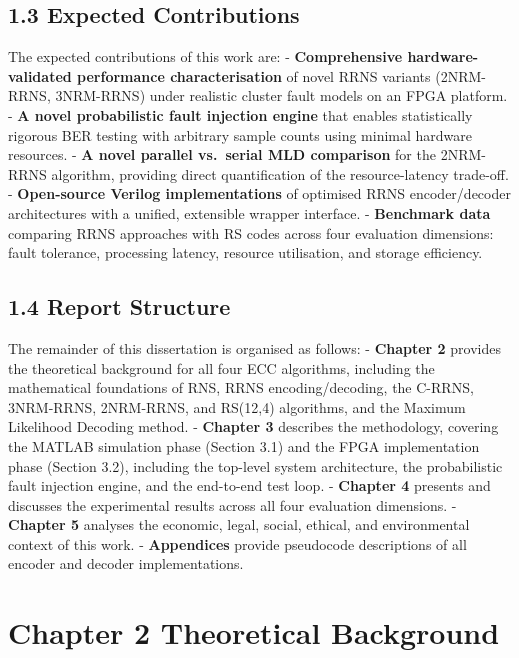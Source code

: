 \documentclass[
  12pt,
  a4paper]{report}
\begin{document}
\section{1.3 Expected Contributions}\label{expected-contributions}

The expected contributions of this work are: - \textbf{Comprehensive
hardware-validated performance characterisation} of novel RRNS variants
(2NRM-RRNS, 3NRM-RRNS) under realistic cluster fault models on an FPGA
platform. - \textbf{A novel probabilistic fault injection engine} that
enables statistically rigorous BER testing with arbitrary sample counts
using minimal hardware resources. - \textbf{A novel parallel vs.~serial
MLD comparison} for the 2NRM-RRNS algorithm, providing direct
quantification of the resource-latency trade-off. - \textbf{Open-source
Verilog implementations} of optimised RRNS encoder/decoder architectures
with a unified, extensible wrapper interface. - \textbf{Benchmark data}
comparing RRNS approaches with RS codes across four evaluation
dimensions: fault tolerance, processing latency, resource utilisation,
and storage efficiency.

\section{1.4 Report Structure}\label{report-structure}

The remainder of this dissertation is organised as follows: -
\textbf{Chapter 2} provides the theoretical background for all four ECC
algorithms, including the mathematical foundations of RNS, RRNS
encoding/decoding, the C-RRNS, 3NRM-RRNS, 2NRM-RRNS, and RS(12,4)
algorithms, and the Maximum Likelihood Decoding method. -
\textbf{Chapter 3} describes the methodology, covering the MATLAB
simulation phase (Section 3.1) and the FPGA implementation phase
(Section 3.2), including the top-level system architecture, the
probabilistic fault injection engine, and the end-to-end test loop. -
\textbf{Chapter 4} presents and discusses the experimental results
across all four evaluation dimensions. - \textbf{Chapter 5} analyses the
economic, legal, social, ethical, and environmental context of this
work. - \textbf{Appendices} provide pseudocode descriptions of all
encoder and decoder implementations.

\chapter{Chapter 2 Theoretical
Background}\label{chapter-2-theoretical-background}
\end{document}
